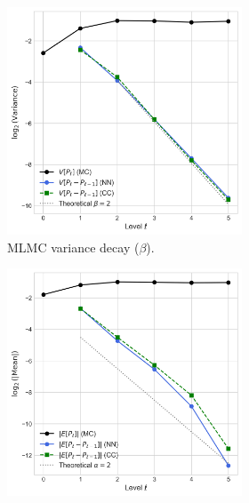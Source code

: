 \begin{figure}[htbp]
    \centering
    \begin{subfigure}{\textwidth}
        \centering
        \begin{subfigure}[b]{0.48\textwidth}
            \centering
            \includegraphics[width=\linewidth]{graphics/dk_var_decay.png}
            \caption{MLMC variance decay ($\beta$).}
            \label{fig:variance_decay}
        \end{subfigure}
        \hfill
        \begin{subfigure}[b]{0.48\textwidth}
            \centering
            \includegraphics[width=\linewidth]{graphics/dk_err_decay.png}

\end{subfigure}
\end{subfigure}
\end{figure}
